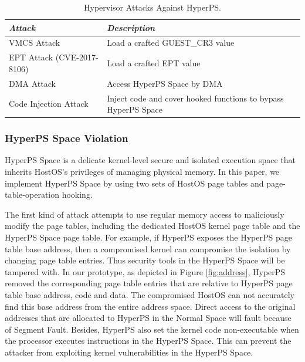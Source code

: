 \begin{table}
\centering
\caption{Hypervisor Attacks Against HyperPS.}\label{tab3}
\begin{tabular}{p{2.8cm}|p{5.5cm}}
\hline
{\itshape\bfseries Attack} & {\itshape\bfseries Description} \\
\hline
VMCS Attack & Load a crafted GUEST\_CR3 value\\
\hline
EPT Attack (CVE-2017-8106) & Load a crafted EPT value \\
\hline
DMA Attack & Access HyperPS Space by DMA \\
\hline
Code Injection Attack & Inject code and cover hooked functions to bypass HyperPS Space \\
\hline
\end{tabular}
\end{table}




\subsubsection{HyperPS Space Violation}%
\label{ssub:hyperps_space_violation}
HyperPS Space is a delicate kernel-level secure and isolated execution space that inherits HostOS's privileges of managing physical memory. 
In this paper, we implement HyperPS Space by using two sets of HostOS page tables and page-table-operation hooking.

The first kind of attack attempts to use regular memory access to maliciously modify the page tables, including the dedicated HostOS kernel page table and the HyperPS Space page table.
For example, if HyperPS exposes the HyperPS page table base address, then a compromised kernel can compromise the isolation by changing page table entries. Thus security tools in the HyperPS Space will be tampered with. 
In our prototype, as depicted in Figure \ref{fig:address},
HyperPS removed the corresponding page table entries that are relative to HyperPS page table base address, code and data. 
The compromised HostOS can not accurately find this base address from the entire address space. 
Direct access to the original addresses that are allocated to HyperPS in the Normal Space will fault because of Segment Fault.
Besides, HyperPS also set the kernel code non-executable when the processor executes instructions in the HyperPS Space. This can prevent the attacker from exploiting kernel vulnerabilities in the HyperPS Space.

